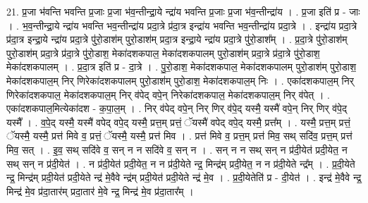 \documentclass[17pt]{extarticle}
\begin{document}
21. प्र॒जा भ॑वन्ति भवन्ति प्र॒जाः प्र॒जा भ॑व॒न्तीन्द्रा॒ये न्द्रा॑य भवन्ति प्र॒जाः प्र॒जा भ॑व॒न्तीन्द्रा॑य । . प्र॒जा इति॑ प्र - जाः । . भ॒व॒न्तीन्द्रा॒ये न्द्रा॑य भवन्ति भव॒न्तीन्द्रा॑य प्रदा॒त्रे प्र॑दा॒त्र इन्द्रा॑य भवन्ति भव॒न्तीन्द्रा॑य प्रदा॒त्रे । . इन्द्रा॑य प्रदा॒त्रे प्र॑दा॒त्र इन्द्रा॒ये न्द्रा॑य प्रदा॒त्रे पु॑रो॒डाश॑म् पुरो॒डाश॑म् प्रदा॒त्र इन्द्रा॒ये न्द्रा॑य प्रदा॒त्रे पु॑रो॒डाश᳚म् । . प्र॒दा॒त्रे पु॑रो॒डाश॑म् पुरो॒डाश॑म् प्रदा॒त्रे प्र॑दा॒त्रे पु॑रो॒डाश॒ मेका॑दशकपाल॒ मेका॑दशकपालम् पुरो॒डाश॑म् प्रदा॒त्रे प्र॑दा॒त्रे पु॑रो॒डाश॒ मेका॑दशकपालम् । . प्र॒दा॒त्र इति॑ प्र - दा॒त्रे । . पु॒रो॒डाश॒ मेका॑दशकपाल॒ मेका॑दशकपालम् पुरो॒डाश॑म् पुरो॒डाश॒ मेका॑दशकपाल॒म् निर् णिरेका॑दशकपालम् पुरो॒डाश॑म् पुरो॒डाश॒ मेका॑दशकपाल॒म् निः । . एका॑दशकपाल॒म् निर् णिरेका॑दशकपाल॒ मेका॑दशकपाल॒म् निर् व॑पेद् वपे॒न् निरेका॑दशकपाल॒ मेका॑दशकपाल॒म् निर् व॑पेत् । . एका॑दशकपाल॒मित्येका॑दश - क॒पा॒ल॒म् । . निर् व॑पेद् वपे॒न् निर् णिर् व॑पे॒द् यस्मै॒ यस्मै॑ वपे॒न् निर् णिर् व॑पे॒द् यस्मै᳚ । . व॒पे॒द् यस्मै॒ यस्मै॑ वपेद् वपे॒द् यस्मै॒ प्रत्त॒म् प्रत्तं॒ ॅयस्मै॑ वपेद् वपे॒द् यस्मै॒ प्रत्त᳚म् । . यस्मै॒ प्रत्त॒म् प्रत्तं॒ ॅयस्मै॒ यस्मै॒ प्रत्त॑ मिवे व॒ प्रत्तं॒ ॅयस्मै॒ यस्मै॒ प्रत्त॑ मिव । . प्रत्त॑ मिवे व॒ प्रत्त॒म् प्रत्त॑ मिव॒ सथ् सदि॑व॒ प्रत्त॒म् प्रत्त॑ मिव॒ सत् । . इ॒व॒ सथ् सदि॑वे व॒ सन् न न सदि॑वे व॒ सन् न । . सन् न न सथ् सन् न प्र॑दी॒येत॑ प्रदी॒येत॒ न सथ् सन् न प्र॑दी॒येत॑ । . न प्र॑दी॒येत॑ प्रदी॒येत॒ न न प्र॑दी॒येते न्द्र॒ मिन्द्र॑म् प्रदी॒येत॒ न न प्र॑दी॒येते न्द्र᳚म् । . प्र॒दी॒येते न्द्र॒ मिन्द्र॑म् प्रदी॒येत॑ प्रदी॒येते न्द्र॑ मे॒वैवे न्द्र॑म् प्रदी॒येत॑ प्रदी॒येते न्द्र॑ मे॒व । . प्र॒दी॒येतेति॑ प्र - दी॒येत॑ । . इन्द्र॑ मे॒वैवे न्द्र॒ मिन्द्र॑ मे॒व प्र॑दा॒तार॑म् प्रदा॒तार॑ मे॒वे न्द्र॒ मिन्द्र॑ मे॒व प्र॑दा॒तार᳚म् । \newline
\end{document}
